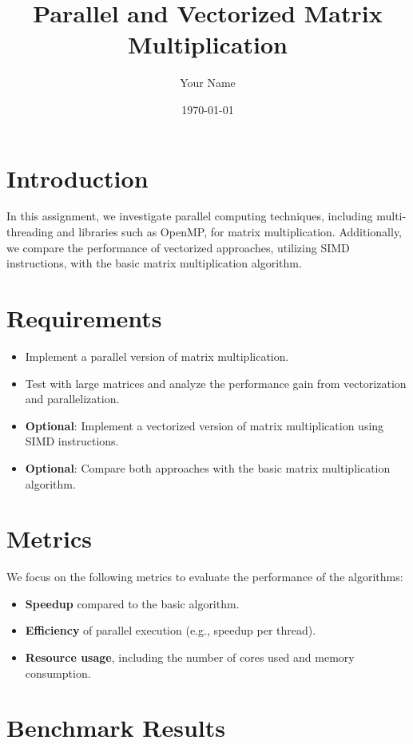 \documentclass{article}
\title{Parallel and Vectorized Matrix Multiplication}
\author{Your Name}
\date{\today}
\begin{document}
\maketitle

\section{Introduction}

In this assignment, we investigate parallel computing techniques, including multi-threading and libraries such as OpenMP, for matrix multiplication. Additionally, we compare the performance of vectorized approaches, utilizing SIMD instructions, with the basic matrix multiplication algorithm.

\section{Requirements}
\begin{itemize}
    \item Implement a parallel version of matrix multiplication.
    \item Test with large matrices and analyze the performance gain from vectorization and parallelization.
    \item \textbf{Optional}: Implement a vectorized version of matrix multiplication using SIMD instructions.
    \item \textbf{Optional}: Compare both approaches with the basic matrix multiplication algorithm.
\end{itemize}

\section{Metrics}
We focus on the following metrics to evaluate the performance of the algorithms:
\begin{itemize}
    \item \textbf{Speedup} compared to the basic algorithm.
    \item \textbf{Efficiency} of parallel execution (e.g., speedup per thread).
    \item \textbf{Resource usage}, including the number of cores used and memory consumption.
\end{itemize}

\section{Benchmark Results}
\end{document}
